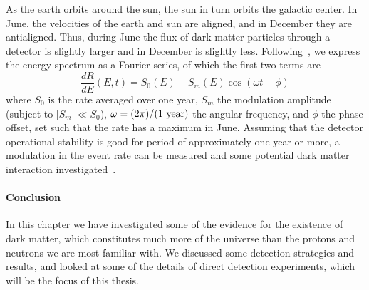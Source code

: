 As the earth orbits around the sun, the sun in turn orbits the galactic center. In June, the velocities of the earth and sun are aligned, and in December they are antialigned. Thus, during June the flux of dark matter particles through a detector is slightly larger and in December is slightly less. Following~\cite{Freese:2012xd}, we express the energy spectrum as a Fourier series, of which the first two terms are
\begin{equation}\label{eq:modulation}
\frac{dR}{dE}(E,t) = S_0(E) + S_m(E)\cos (\omega t - \phi)
\end{equation}
where $S_0$ is the rate averaged over one year, $S_m$ the modulation amplitude (subject to $|S_m| \ll S_0$), $\omega = (2\pi)/(1~\mathrm{year})$ the angular frequency, and $\phi$ the phase offset, set such that the rate has a maximum in June. Assuming that the detector operational stability is good for period of approximately one year or more, a modulation in the event rate can be measured and some potential dark matter interaction investigated~\cite{Aprile:2017yea,Abe:2018mxq}.

\paragraph{Conclusion} In this chapter we have investigated some of the evidence for the existence of dark matter, which constitutes much more of the universe than the protons and neutrons we are most familiar with. We discussed some detection strategies and results, and looked at some of the details of direct detection experiments, which will be the focus of this thesis.